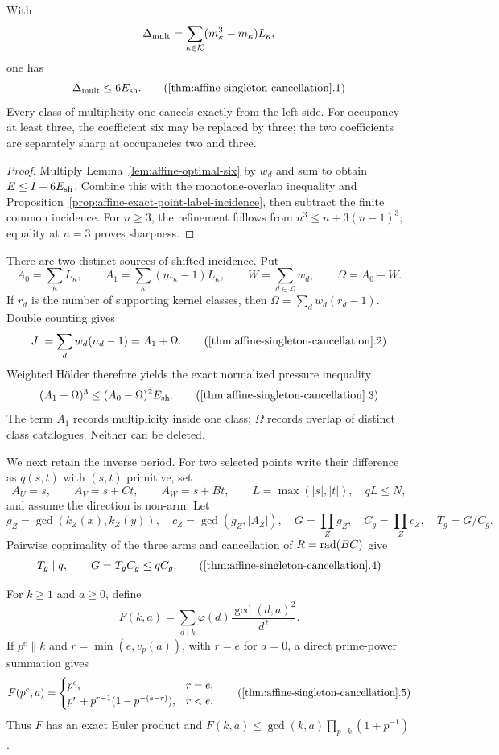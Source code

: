 \begin{theorem}
\label{thm:affine-singleton-cancellation}
With
\[
 \Delta_{\rm mult}=
 \sum_{\kappa\in\mathcal K}(m_\kappa^3-m_\kappa)L_\kappa,
\]
one has
\[
                         \Delta_{\rm mult}\le6E_{\rm sh}.              \tag{\ref{thm:affine-singleton-cancellation}.1}
\]
Every class of multiplicity one cancels exactly from the left side.
For occupancy at least three, the coefficient six may be replaced by three;
the two coefficients are separately sharp at occupancies two and three.
\end{theorem}

\begin{proof}
Multiply Lemma~\ref{lem:affine-optimal-six} by $w_d$ and sum to obtain
$E\le I+6E_{\rm sh}$.  Combine this with the monotone-overlap inequality
and Proposition~\ref{prop:affine-exact-point-label-incidence}, then subtract
the finite common incidence.  For $n\ge3$, the refinement follows from
$n^3\le n+3(n-1)^3$; equality at $n=3$ proves sharpness.
\end{proof}

There are two distinct sources of shifted incidence.  Put
\[
 A_0=\sum_\kappa L_\kappa,\qquad
 A_1=\sum_\kappa(m_\kappa-1)L_\kappa,\qquad
 W=\sum_{d\in\mathcal L}w_d,\qquad \Omega=A_0-W.
\]
If $r_d$ is the number of supporting kernel classes, then
$\Omega=\sum_dw_d(r_d-1)$.  Double counting gives
\[
 J:=\sum_dw_d(n_d-1)=A_1+\Omega.
 \tag{\ref{thm:affine-singleton-cancellation}.2}
\]
Weighted H\"older therefore yields the exact normalized pressure inequality
\[
                  (A_1+\Omega)^3\le(A_0-\Omega)^2E_{\rm sh}.           \tag{\ref{thm:affine-singleton-cancellation}.3}
\]
The term $A_1$ records multiplicity inside one class; $\Omega$ records
overlap of distinct class catalogues.  Neither can be deleted.

We next retain the inverse period.  For two selected points write their
difference as $q(s,t)$ with $(s,t)$ primitive, set
\[
 A_U=s,\qquad A_V=s+Ct,\qquad A_W=s+Bt,\qquad
 L=\max(|s|,|t|),\quad qL\le N,
\]
and assume the direction is non-arm.  Let
\[
 g_Z=\gcd(k_Z(x),k_Z(y)),\quad c_Z=\gcd(g_Z,|A_Z|),
 \quad G=\prod_Zg_Z,\quad C_g=\prod_Zc_Z,\quad
 T_g=G/C_g.
\]
Pairwise coprimality of the three arms and cancellation of
$R=\operatorname{rad}(BC)$ give
\[
                         T_g\mid q,\qquad G=T_gC_g\le qC_g.            \tag{\ref{thm:affine-singleton-cancellation}.4}
\]

For $k\ge1$ and $a\ge0$, define
\[
 F(k,a)=\sum_{d\mid k}\varphi(d)\frac{\gcd(d,a)^2}{d^2}.
\]
If $p^e\parallel k$ and $r=\min(e,v_p(a))$, with $r=e$ for $a=0$, a direct
prime-power summation gives
\[
 F(p^e,a)=
 \begin{cases}
 p^e,&r=e,\\
 p^r+p^{r-1}(1-p^{-(e-r)}),&r<e.
 \end{cases}                                             \tag{\ref{thm:affine-singleton-cancellation}.5}
\]
Thus $F$ has an exact Euler product and
$F(k,a)\le\gcd(k,a)\prod_{p\mid k}(1+p^{-1})$.

